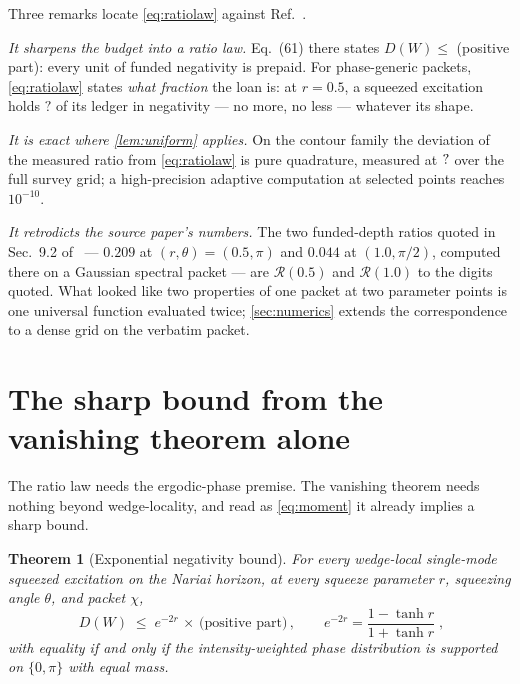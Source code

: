 \documentclass[11pt,a4paper]{article}
\newcommand{\NFRatioHalf}{?}\newcommand{\NFRatioOne}{?}
\theoremstyle{plain}
\newtheorem{theorem}{Theorem}
\theoremstyle{definition}
\begin{document}
Three remarks locate \cref{eq:ratiolaw} against Ref.~\cite{NariaiI}.

\emph{It sharpens the budget into a ratio law.} Eq.~(61) there states
$D(W) \le$ (positive part): every unit of funded negativity is prepaid. For
phase-generic packets, \cref{eq:ratiolaw} states \emph{what fraction} the
loan is: at $r = 0.5$, a squeezed excitation holds
$\NFRatioHalf$ of its ledger in negativity --- no more, no less ---
whatever its shape.

\emph{It is exact where \cref{lem:uniform} applies.} On the contour family
the deviation of the measured ratio from \cref{eq:ratiolaw} is pure
quadrature, measured at $?$ over the full survey grid; a
high-precision adaptive computation at selected points reaches $10^{-10}$.

\emph{It retrodicts the source paper's numbers.} The two funded-depth ratios
quoted in Sec.~9.2 of~\cite{NariaiI} --- $0.209$ at $(r,\theta) = (0.5,\pi)$
and $0.044$ at $(1.0, \pi/2)$, computed there on a Gaussian spectral packet
--- are $\mathcal{R}(0.5)$ and $\mathcal{R}(1.0)$ to the digits quoted. What
looked like two properties of one packet at two parameter points is one
universal function evaluated twice; \cref{sec:numerics} extends the
correspondence to a dense grid on the verbatim packet.


\section{The sharp bound from the vanishing theorem alone}
\label{sec:bound}

The ratio law needs the ergodic-phase premise. The vanishing theorem needs
nothing beyond wedge-locality, and read as \cref{eq:moment} it already
implies a sharp bound.

\begin{theorem}[Exponential negativity bound]
\label{thm:bound}
For every wedge-local single-mode squeezed excitation on the Nariai horizon,
at every squeeze parameter $r$, squeezing angle $\theta$, and packet
$\chi$,
%
\begin{equation}
\boxed{\;
D(W) \;\le\; e^{-2r}\,\times\,\bigl(\text{positive part}\bigr)\,,
\qquad
e^{-2r} = \frac{1-\tanh r}{1+\tanh r}\;,
}
\label{eq:bound}
\end{equation}
%
with equality if and only if the intensity-weighted phase distribution is
supported on $\{0, \pi\}$ with equal mass.
\end{theorem}
\end{document}
